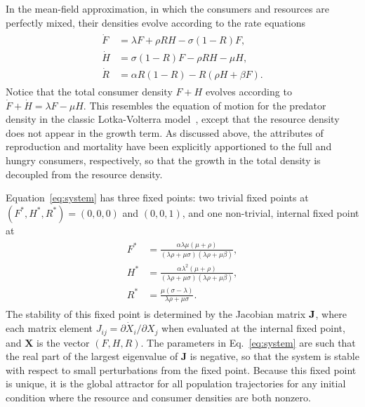 \documentclass[twocolumn,preprintnumbers,amsmath,amssymb,superscriptaddress]{revtex4}
\begin{document}
In the mean-field approximation, in which the consumers and resources are perfectly mixed, their densities evolve according to the rate equations
\begin{align} 
\label{eq:system}
\begin{split}
\dot{F} &= \lambda F + \rho RH - \sigma (1-R)F,  \\
\dot{H} &= \sigma (1-R)F - \rho RH - \mu H,  \\
\dot{R} &= \alpha R(1-R) - R(\rho H+ \beta F).
\end{split}
\end{align}
Notice that the total consumer density $F+H$ evolves according to $\dot{F}+\dot{H}=\lambda F-\mu H$.  
This resembles the equation of motion for the predator density in the classic Lotka-Volterra model~\cite{murray2011mathematical}, except that the resource density does not appear in the growth term.  
As discussed above, the attributes of reproduction and mortality have been explicitly apportioned to the full and hungry consumers, respectively, so that the growth in the total density is decoupled from the resource density.

Equation~\eqref{eq:system} has three fixed points: two trivial fixed points at $(F^*,H^*,R^*)=(0,0,0)$ and $(0,0,1)$, and one non-trivial, internal fixed point at
\begin{align}
\label{eq:ss}
\begin{split}
F^* &= \frac{\alpha  \lambda  \mu  (\mu +\rho )}{(\lambda  \rho +\mu  \sigma ) (\lambda  \rho +\mu  \beta)}, \\
H^* &= \frac{\alpha  \lambda ^2 (\mu +\rho )}{(\lambda  \rho +\mu  \sigma ) (\lambda  \rho +\mu  \beta)}, \\
R^* &= \frac{\mu  (\sigma -\lambda )}{\lambda  \rho +\mu  \sigma }.
\end{split}
\end{align}
The stability of this fixed point is determined by the Jacobian matrix
$\bf J$, where each matrix element $J_{ij}=\partial{\dot X_i}/\partial{X_j}$
when evaluated at the internal fixed point, and $\mathbf{X}$ is the vector
$(F,H,R)$.  The parameters in Eq.~\eqref{eq:system} are such that the real
part of the largest eigenvalue of $\mathbf{J}$ is negative, so that the
system is stable with respect to small perturbations from the fixed point.
Because this fixed point is unique, it is the global attractor for all
population trajectories for any initial condition where the resource and
consumer densities are both nonzero.
\end{document}
